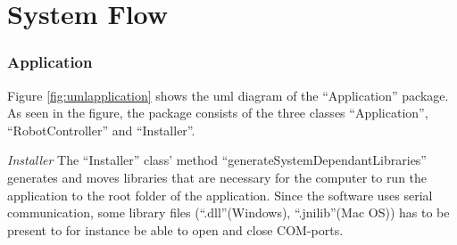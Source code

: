 \section{System Flow}
\subsubsection{Application}
Figure \ref{fig:umlapplication} shows the \acrfull{uml} diagram of the ``Application'' package. As seen in the figure, the package consists of the three classes ``Application'', ``RobotController'' and ``Installer''.

\textit{Installer}  
The ``Installer'' class' method ``generateSystemDependantLibraries'' generates and moves libraries that are necessary for the computer to run the application to the root folder of the application. Since the software uses serial communication, some library files (``.dll''(Windows), ``.jnilib''(Mac OS)) has to be present to for instance be able to open and close COM-ports. 


